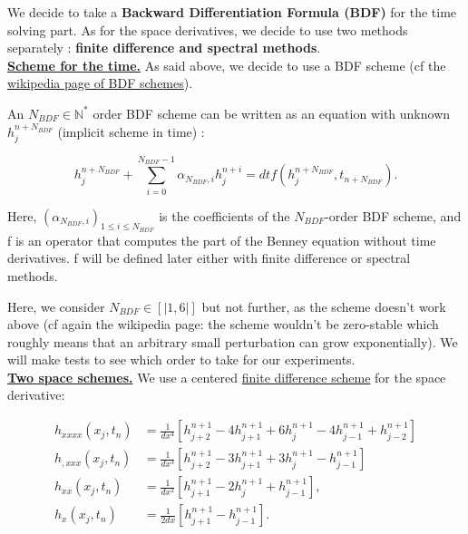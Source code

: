 \documentclass[12pt]{article}
\begin{document}
We decide to take a \textbf{Backward Differentiation Formula (BDF)} for the time solving part. As for the space derivatives, we decide 
to use two methods separately : \textbf{finite difference and spectral methods}. 
\\

\underline{\textbf{Scheme for the time.}}
As said above, we decide to use a BDF scheme (cf the \href{https://en.wikipedia.org/wiki/Backward_differentiation_formula}{wikipedia page of BDF schemes}).

An $N_{BDF}\in \mathbb{N}^*$ order BDF scheme can be written as an equation with unknown $h_j^{n+N_{BDF}}$ (implicit scheme in time) :

\begin{equation}\label{eq:BDF_scheme}
    h_{j}^{n+N_{BDF}} + \sum_{i=0}^{N_{BDF}-1} \alpha_{N_{BDF}, i}h_{j}^{n+i} = dtf(h_j^{n+N_{BDF}}, t_{n+N_{BDF}}).
\end{equation}

Here, $(\alpha_{N_{BDF},i})_{1\leq i \leq N_{BDF}}$ is the coefficients of the $N_{BDF}$-order BDF scheme, and f is an operator that computes the part of the 
Benney equation without time derivatives. f will be defined later either with finite difference or spectral methods.

Here, we consider $N_{BDF}\in [|1,6|]$ but not further, as the scheme doesn't work above (cf again the wikipedia page: the scheme
 wouldn't be zero-stable which roughly means that an arbitrary small perturbation can grow exponentially). We will make tests to see which order to take for our experiments.
\\

\underline{\textbf{Two space schemes.}}
We use a centered \underline{finite difference scheme} for the space derivative: 

\begin{equation}
\begin{aligned}
    h_{xxxx}(x_j, t_n) &= \frac{1}{dx^4}[h_{j+2}^{n+1} -4h_{j+1}^{n+1} +6h_{j}^{n+1} - 4h_{j-1}^{n+1} + h_{j-2}^{n+1}]\\   
    h_{,xxx}(x_j,t_n)&=\frac{1}{dx^3}[h^{n+1}_{j+2}-3h^{n+1}_{j+1} +3h^{n+1}_{j}-h^{n+1}_{j-1}]\\
  h_{xx}(x_j, t_n) &= \frac{1}{dx^2}[h_{j+1}^{n+1} -2h_{j}^{n+1} +h_{j-1}^{n+1}],\\ 
  h_{x}(x_j, t_n) &= \frac{1}{2dx}[h_{j+1}^{n+1} -h_{j-1}^{n+1}] . 
\end{aligned}
\end{equation}
\end{document}
